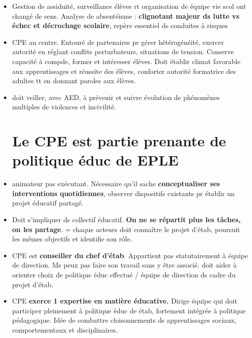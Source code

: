\documentclass[12pt]{report}
\begin{document}
\begin{itemize}
\item Gestion de assiduité, surveillance élèves rt organisation de équipe vie scol ont changé de sens. Analyse de absentéisme : \textbf{clignotant majeur ds lutte vs échec et décrochage scolaire}, repère essentiel ds conduites à risques \\

\item CPE au centre. Entouré de partenaires pr gérer hétérogénéité, exercer autorité en réglant conflits perturbateurs, situations de tension. Conserve capacité à compde, former et intéresser élèves. Doit établir climat favorable aux apprentissages et réussite des élèves, conforter autorité formatrice des adultes tt en donnant paroles aux élèves. \\

\item doit veiller, avec AED,  à prévenir et suivre évolution de phénomènes multiples de violences et incivilité.

\section{Le CPE est partie prenante de politique éduc de EPLE}

\item animateur pas exécutant. Nécessaire qu'il sache \textbf{conceptualiser ses interventions quotidiennes}, observer dispositifs existants pr établir un projet éducatif partagé.\\

\item Doit s'impliquer ds collectif éducatif. \textbf{On ne se répartit plus les tâches, on les partage}. = chaque acteurs doit connaître le projet d'étab, poursuit les mêmes objectifs et identifie son rôle.\\

\item CPE est \textbf{conseiller du chef d'étab}. Appartient pas statutairement  à équipe de direction. Ms peux pas faire son travail sans y être associé. doit aider à orienter choix de politique éduc effectué / équipe de direction ds cadre du projet d'étab. \\

 \item CPE \textbf{exerce 1 expertise en matière éducative.} Dirige équipe qui doit participer pleinement à politique éduc de étab, fortement intégrée à politique pédagogique. Idée de combattre cloisonnements ds apprentissages sociaux, comportementaux et disciplinaires. \\



\end{itemize}
\end{document}

